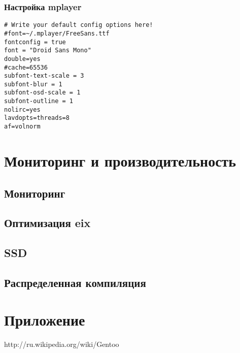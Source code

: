 \documentclass[12pt, a4paper]{article}
\begin{document}
\subsubsection{Настройка mplayer}
\begin{verbatim}
# Write your default config options here!
#font=~/.mplayer/FreeSans.ttf
fontconfig = true
font = "Droid Sans Mono"
double=yes
#cache=65536
subfont-text-scale = 3
subfont-blur = 1
subfont-osd-scale = 1
subfont-outline = 1
nolirc=yes
lavdopts=threads=8
af=volnorm
\end{verbatim}

\newpage
\section{Мониторинг и производительность}

\subsection{Мониторинг}

\subsection{Оптимизация eix}

\subsection{SSD}

\subsection{Распределенная компиляция}

\newpage

\section{Приложение}


\newpage
\begin{thebibliography}{99}

	 http://ru.wikipedia.org/wiki/Gentoo
	
	

\end{thebibliography}
\end{document}
